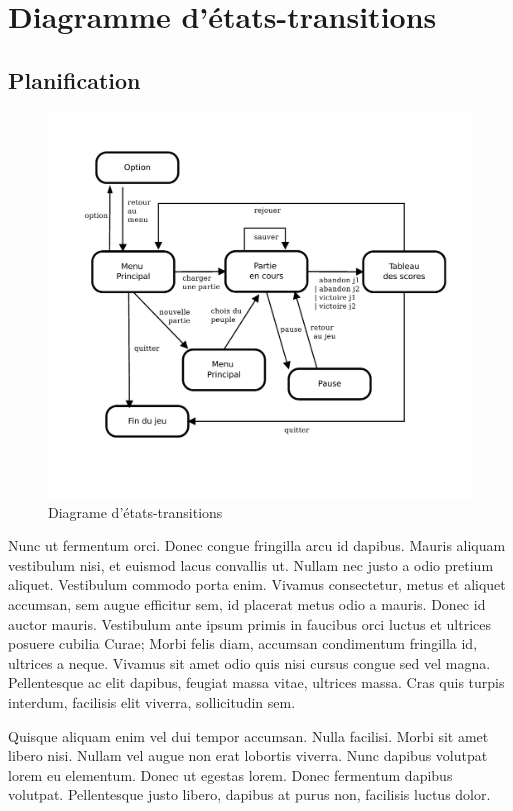 \section{Diagramme d'états-transitions}

	\subsection{Planification}
		\begin{figure}
			\begin{center}
				\includegraphics[width=1\textwidth]{figure/etat_transition_partie.pdf}
			\end{center}
			\caption{Diagrame d'états-transitions}
			\label{fig:planif}
		\end{figure}

		Nunc ut fermentum orci. Donec congue fringilla arcu id dapibus. Mauris aliquam vestibulum nisi, et euismod lacus convallis ut. Nullam nec justo a odio pretium aliquet. Vestibulum commodo porta enim. Vivamus consectetur, metus et aliquet accumsan, sem augue efficitur sem, id placerat metus odio a mauris. Donec id auctor mauris. Vestibulum ante ipsum primis in faucibus orci luctus et ultrices posuere cubilia Curae; Morbi felis diam, accumsan condimentum fringilla id, ultrices a neque. Vivamus sit amet odio quis nisi cursus congue sed vel magna. Pellentesque ac elit dapibus, feugiat massa vitae, ultrices massa. Cras quis turpis interdum, facilisis elit viverra, sollicitudin sem.

		Quisque aliquam enim vel dui tempor accumsan. Nulla facilisi. Morbi sit amet libero nisi. Nullam vel augue non erat lobortis viverra. Nunc dapibus volutpat lorem eu elementum. Donec ut egestas lorem. Donec fermentum dapibus volutpat. Pellentesque justo libero, dapibus at purus non, facilisis luctus dolor. 
